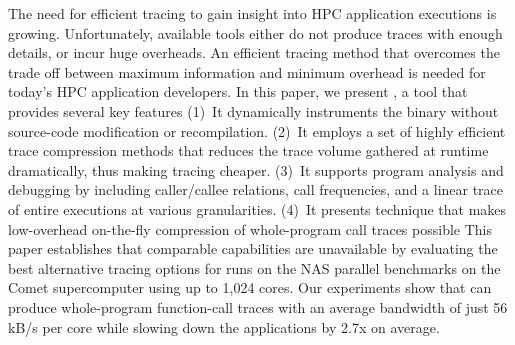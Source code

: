 The need for efficient tracing to gain insight into
HPC application executions is growing. 
%
Unfortunately, available tools either do not produce traces with enough details,
or incur huge overheads.
%
An efficient  tracing method that overcomes the trade off
between maximum information and minimum overhead
is needed for today's HPC application developers.
% 
In this paper, we present \parlot, a tool that provides several key
features (1)~It dynamically instruments the binary without source-code modification or recompilation.
%
(2)~It employs a set of highly efficient trace compression methods that reduces the trace volume gathered at runtime dramatically, thus making tracing cheaper.
%
(3)~It supports program analysis and debugging by
including caller/callee
relations, call frequencies, and a linear trace of entire executions
at various granularities.
%
(4)~It presents technique that makes low-overhead on-the-fly compression of whole-program call traces possible
%
This paper establishes that comparable capabilities are 
unavailable by evaluating the best alternative tracing options for runs on the NAS parallel benchmarks on the
Comet supercomputer using up to 1,024 cores.
%
Our experiments show that \parlot can produce whole-program function-call
traces with an average bandwidth of just 56 kB/s per core while 
slowing down the applications by 2.7x on average. 
